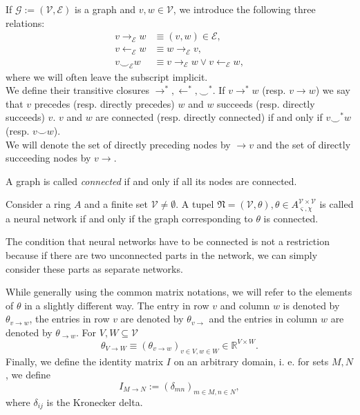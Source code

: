 \documentclass[a4paper,11pt]{report}
\newcommand{\const}{\varsigma} %
\newcommand{\var}{\chi} %
\newcommand{\conn}{\smile} %
\begin{document}
\begin{Def}
If $\mathcal{G}:=(\mathcal{V},\mathcal{E})$ is a graph and $v,w\in\mathcal{V}$, we introduce the following three relations:
\begin{align}
v\to_{\mathcal{E}} w&\equiv (v,w)\in\mathcal{E},\\
v\leftarrow_{\mathcal{E}} w &\equiv w\to_{\mathcal{E}} v,\\
v\conn_{\mathcal{E}} w &\equiv v\to_{\mathcal{E}} w\vee v\leftarrow_{\mathcal{E}} w,
\end{align}
where we will often leave the subscript implicit.\\
We define their transitive closures $\to^*,\leftarrow^*,\conn^*$. If $v\to^* w$ (resp. $v\to w$) we say that $v$ precedes (resp. directly precedes) $w$ and $w$ succeeds (resp. directly succeeds) $v$. $v$ and $w$ are connected (resp. directly connected) if and only if $v\conn^* w$ (resp. $v\conn w$).\\
We will denote the set of directly preceding nodes by $\to v$ and the set of directly succeeding nodes by $v\to$.
\end{Def}

\begin{Def}
A graph is called \emph{connected} if and only if all its nodes are connected.
\end{Def}

\begin{Def}
Consider a ring $A$ and a finite set $\mathcal{V}\ne\emptyset$. A tupel $\mathfrak{N}=(\mathcal{V},\theta), \theta\in A_{\const,\var}^{\mathcal{V}\times\mathcal{V}}$ is called a neural network if and only if the graph corresponding to $\theta$ is connected.
\end{Def}

\begin{Rem}
The condition that neural networks have to be connected is not a restriction because if there are two unconnected parts in the network, we can simply consider these parts as separate networks.
\end{Rem}

\begin{Not}
While generally using the common matrix notations, we will refer to the elements of $\theta$ in a slightly different way. The entry in row $v$ and column $w$ is denoted by $\theta_{v\to w}$, the entries in row $v$ are denoted by $\theta_{v\to}$ and the entries in column $w$ are denoted by $\theta_{\to w}$. For $V,W\subseteq\mathcal{V}$
\[
\theta_{V\to W}\equiv\left(\theta_{v\to w}\right)_{v\in V,w\in W}\in\mathbb{R}^{V\times W}.
\]
Finally, we define the identity matrix $I$ on an arbitrary domain, i. e. for sets $M, N$, we define
\[
I_{M\to N}:=(\delta_{mn})_{m\in M,n\in N},
\]
where $\delta_{ij}$ is the Kronecker delta.
\end{Not}
\end{document}
